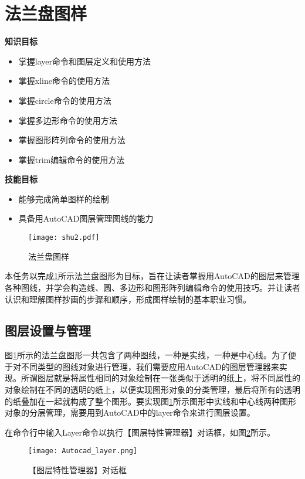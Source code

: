 \section{法兰盘图样}\label{sec:falan}

{\bfseries 知识目标}
\begin{itemize}
\item 掌握layer命令和图层定义和使用方法
\item 掌握xline命令的使用方法
\item 掌握circle命令的使用方法
\item 掌握多边形命令的使用方法
\item 掌握图形阵列命令的使用方法
\item 掌握trim编辑命令的使用方法
\end{itemize}

{\bfseries 技能目标}
\begin{itemize}
\item 能够完成简单图样的绘制
\item 具备用AutoCAD图层管理图线的能力
\end{itemize}

\noindent
\begin{figure}[htbp]
\centering
\texttt{[image: shu2.pdf]}
\caption{法兰盘图样}\label{fig:renwu2}
\end{figure}

\indent
本任务以完成\ref{fig:renwu2}所示法兰盘图形为目标，旨在让读者掌握用AutoCAD的图层来管理各种图线，并学会构造线、圆、多边形和图形阵列编辑命令的使用技巧。并让读者认识和理解图样抄画的步骤和顺序，形成图样绘制的基本职业习惯。

\subsection{图层设置与管理}
图\ref{fig:renwu2}所示的法兰盘图形一共包含了两种图线，一种是实线，一种是中心线。为了便于对不同类型的图线对象进行管理，我们需要应用AutoCAD的图层管理器来实现。所谓图层就是将属性相同的对象绘制在一张类似于透明的纸上，将不同属性的对象绘制在不同的透明的纸上，以便实现图形对象的分类管理，最后将所有的透明的纸叠加在一起就构成了整个图形。要实现图\ref{fig:renwu2}所示图形中实线和中心线两种图形对象的分层管理，需要用到AutoCAD中的layer命令来进行图层设置。

在命令行中输入Layer命令以执行【图层特性管理器】对话框，如图\ref{fig:tuchenguanliqi}所示。

\begin{figure}[htbp]
\centering
\texttt{[image: Autocad\_layer.png]}
\caption{【图层特性管理器】对话框}\label{fig:tuchenguanliqi}
\end{figure}

